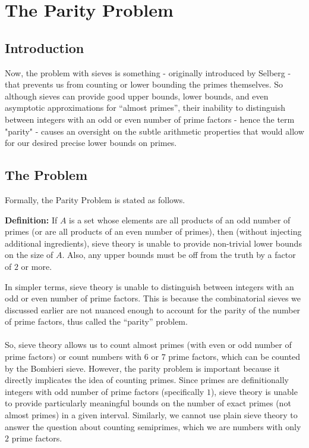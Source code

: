 \pagebreak
\section{The Parity Problem}  
\subsection{Introduction}
Now, the problem with sieves is something - originally introduced by Selberg - that prevents us from counting or lower bounding the primes themselves. So although sieves can provide good upper bounds, lower bounds, and even asymptotic approximations for ``almost primes'', their inability to distinguish between integers with an odd or even number of prime factors - hence the term "parity" - causes an oversight on the subtle arithmetic properties that would allow for our desired precise lower bounds on primes.
\subsection{The Problem}
Formally, the Parity Problem is stated as follows.
\begin{boxedsection}
\textbf{Definition:} If $A$ is a set whose elements are all products of an odd number of primes (or are all products of an even number of primes), then (without injecting additional ingredients), sieve theory is unable to provide non-trivial lower bounds on the size of $A$. Also, any upper bounds must be off from the truth by a factor of $2$ or more.
\end{boxedsection}
In simpler terms, sieve theory is unable to distinguish between integers with an odd or even number of prime factors. This is because the combinatorial sieves we discussed earlier are not nuanced enough to account for the parity of the number of prime factors, thus called the ``parity'' problem. \\
\\
So, sieve theory allows us to count almost primes (with even or odd number of prime factors) or count numbers with $6$ or $7$ prime factors, which can be counted by the Bombieri sieve. 
However, the parity problem is important because it directly implicates the idea of counting primes. Since primes are definitionally integers with odd number of prime factors (specifically $1$), sieve theory is unable to provide particularly meaningful bounds on the number of exact primes (not almost primes) in a given interval. 
Similarly, we cannot use plain sieve theory to answer the question about counting semiprimes, which we are numbers with only $2$ prime factors. 
